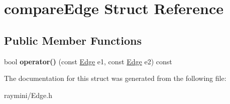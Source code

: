 \hypertarget{structcompare_edge}{
\section{compareEdge Struct Reference}
\label{structcompare_edge}
}
\subsection*{Public Member Functions}
\begin{DoxyCompactItemize}
\item 
\hypertarget{structcompare_edge_a1b45180f4ef2d56cdd1539f8035199f8}{
bool {\bfseries operator()} (const \hyperlink{struct_edge}{Edge} e1, const \hyperlink{struct_edge}{Edge} e2) const }
\label{structcompare_edge_a1b45180f4ef2d56cdd1539f8035199f8}

\end{DoxyCompactItemize}


The documentation for this struct was generated from the following file:\begin{DoxyCompactItemize}
\item 
raymini/Edge.h\end{DoxyCompactItemize}
